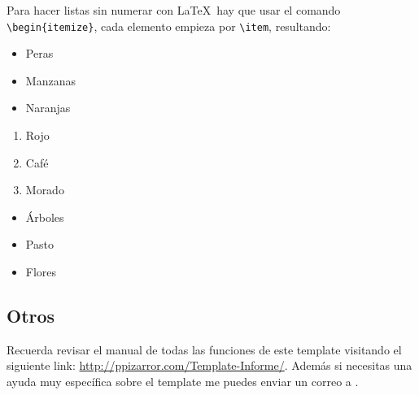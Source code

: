 		Para hacer listas sin numerar con \LaTeX\ hay que usar el comando \texttt{\textbackslash begin\{itemize\}}, cada elemento empieza por \texttt{\textbackslash item}, resultando:
		
		\begin{multicols}{3}
			\begin{itemize}[label={--}]
				\item Peras
				\item Manzanas
				\item Naranjas
			\end{itemize}
			
			\begin{enumerate}[label={*}]
				\item Rojo
				\item Café
				\item Morado
			\end{enumerate}
			
			\begin{itemize}
				\item Árboles
				\item Pasto
				\item Flores
			\end{itemize}
		\end{multicols}
		
	\subsection{Otros}
		
		Recuerda revisar el manual de todas las funciones de este template visitando el siguiente link: \url{http://ppizarror.com/Template-Informe/}. Además si necesitas una ayuda muy específica sobre el template me puedes enviar un correo a .
		
\newpage %